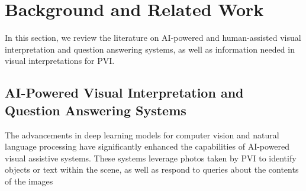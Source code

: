 \section{Background and Related Work}



In this section, we review the literature on AI-powered and human-assisted visual interpretation and question answering systems, as well as information needed in visual interpretations for PVI.


\subsection{AI-Powered Visual Interpretation and Question Answering Systems}


The advancements in deep learning models for computer vision and natural language processing have significantly enhanced the capabilities of AI-powered visual assistive systems. These systems leverage photos taken by PVI to identify objects or text within the scene, as well as respond to queries about the contents of the images


